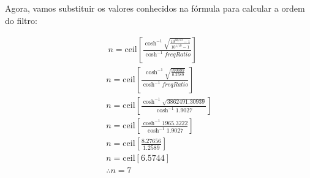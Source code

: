 Agora, vamos substituir os valores conhecidos na fórmula para calcular a ordem do filtro:

\begin{align*} \
    n = \text{ceil} \left[ \frac{\cosh^{-1}{\sqrt{\frac{10^{60/10}- 1}{10^{1/10}-1}}}}{\cosh^{-1}{freqRatio}} \right] \\
    n = \text{ceil} \left[ \frac{\cosh^{-1}{\sqrt{\frac{999999}{0.2589}}}}{\cosh^{-1}{freqRatio}} \right]            \\
    n = \text{ceil} \left[ \frac{\cosh^{-1}{\sqrt{3862491.30939}}}{\cosh^{-1}{1.9027}} \right]                           \\
    n = \text{ceil} \left[ \frac{\cosh^{-1}{1965.3222}}{\cosh^{-1}{1.9027}} \right]                                  \\n = \text{ceil} \left[ \frac{8.27656}{1.2589} \right]                                     \\
    n = \text{ceil} [6.5744]                                                                                      \\
    \therefore n = 7
\end{align*}
